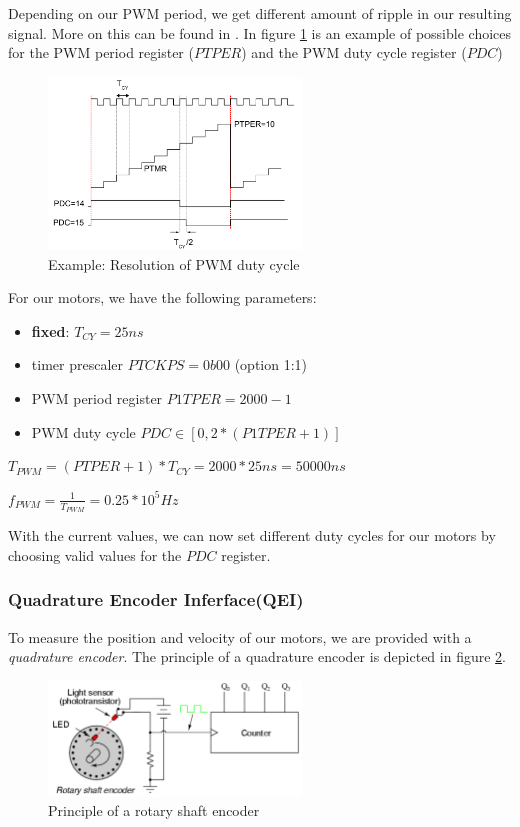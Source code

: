 Depending on our PWM period, we get different amount of ripple in our resulting signal. More on this can be found in \cite[Chapter~5.1]{alex}. In figure \ref{fig:pwm_choice} is an example of possible choices for the PWM period register ($PTPER$) and the PWM duty cycle register ($PDC$)

\begin{figure}[htb]
    \centering
    \includegraphics[width=0.6\textwidth]{figures/software/pwm_choice.png}
    \caption {Example: Resolution of PWM duty cycle \cite{alex}}
    \label{fig:pwm_choice}
\end{figure}

For our motors, we have the following parameters:
\begin{itemize}
    \item \textbf{fixed}: $T_{CY} = 25 ns$
    \item timer prescaler $PTCKPS = 0b00$ (option 1:1)
    \item PWM period register $P1TPER = 2000 - 1$
    \item PWM duty cycle $PDC \in [0, 2*(P1TPER + 1)]$
\end{itemize}
$T_{PWM} = ( PTPER + 1 ) * T_{CY} = 2000 * 25ns = 50000 ns$


$f_{PWM} = \frac{1}{T_{PWM}} = 0.25 * 10^{5} Hz$

With the current values, we can now set different duty cycles for our motors by choosing valid values for the $PDC$ register.


\subsubsection*{Quadrature Encoder Inferface(QEI)}
To measure the position and velocity of our motors, we are provided with a \textit{quadrature encoder}. The principle of a quadrature encoder is depicted in figure \ref{fig:qei_demo}. 

\begin{figure}[htb]
    \centering
    \includegraphics[width=0.6\textwidth]{figures/software/qei_demo.png}
    \caption {Principle of a rotary shaft encoder \cite{alex}}
    \label{fig:qei_demo}
\end{figure}

